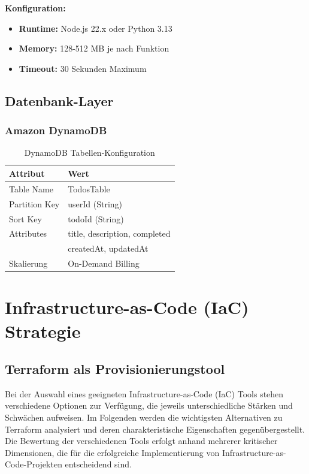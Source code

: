 \textbf{Konfiguration:}
\begin{itemize}
    \item \textbf{Runtime:} Node.js 22.x oder Python 3.13
    \item \textbf{Memory:} 128-512 MB je nach Funktion
    \item \textbf{Timeout:} 30 Sekunden Maximum
\end{itemize}

\subsection{Datenbank-Layer}

\subsubsection{Amazon DynamoDB}

\begin{table}[H]
    \centering
    \begin{tabular}{@{}ll@{}}
        \toprule
        \textbf{Attribut} & \textbf{Wert} \\
        \midrule
        Table Name & TodosTable \\
        Partition Key & userId (String) \\
        Sort Key & todoId (String) \\
        Attributes & title, description, completed \\
        & createdAt, updatedAt \\
        Skalierung & On-Demand Billing \\
        \bottomrule
    \end{tabular}
    \caption{DynamoDB Tabellen-Konfiguration}
    \label{tab:dynamodb}
\end{table}

\section{Infrastructure-as-Code (IaC) Strategie}

\subsection{Terraform als Provisionierungstool}
Bei der Auswahl eines geeigneten Infrastructure-as-Code (IaC) Tools stehen verschiedene Optionen zur Verfügung, 
die jeweils unterschiedliche Stärken und Schwächen aufweisen. Im Folgenden werden die wichtigsten Alternativen 
zu Terraform analysiert und deren charakteristische Eigenschaften gegenübergestellt.
Die Bewertung der verschiedenen Tools erfolgt anhand mehrerer kritischer Dimensionen, die für die 
erfolgreiche Implementierung von Infrastructure-as-Code-Projekten entscheidend sind.

